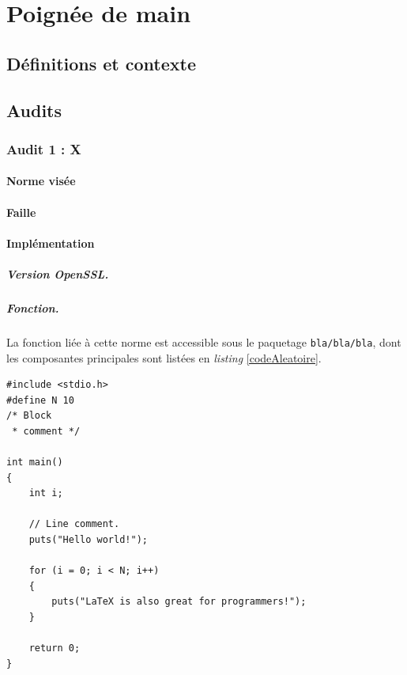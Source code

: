 \chapter{Poignée de main}

\section{Définitions et contexte}

\section{Audits}
	\subsection{Audit 1 : X }
	\subsubsection{Norme visée}
	\subsubsection{Faille}
	\subsubsection{Implémentation}
		
		\paragraph{Version OpenSSL.\\}
		
		\paragraph{Fonction.\\}
		La fonction liée à cette norme est accessible sous le paquetage \texttt{bla/bla/bla}, dont les composantes principales sont listées en \textit{listing} \ref{codeAleatoire}.
		
		
		\begin{lstlisting}[style=customc,caption=codeAleatoire.c, label=codeAleatoire]
#include <stdio.h>
#define N 10
/* Block
 * comment */
 
int main()
{
    int i;
 
    // Line comment.
    puts("Hello world!");
 
    for (i = 0; i < N; i++)
    {
        puts("LaTeX is also great for programmers!");
    }
 
    return 0;
}
		\end{lstlisting}
		
